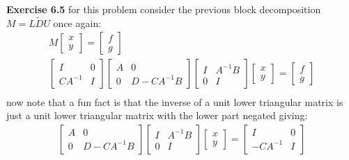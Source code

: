 \documentclass[12pt]{article}
\newenvironment{exercise}[1]{\vspace{.1in}\noindent\textbf{Exercise #1 \hspace{.05em}}}{}
\theoremstyle{definition}
\theoremstyle{remark}
\begin{document}
\begin{exercise}{6.5}
	for this problem consider the previous block decomposition $M=L \tilde{D}U$ once again:
	\begin{align}
		M %
		\begin{bmatrix}
			x \\
			y
		\end{bmatrix}=%
		\begin{bmatrix}
			f \\
			g
		\end{bmatrix} \\
		\begin{bmatrix}
			I       & 0 \\
			CA^{-1} & I
		\end{bmatrix}%
		\begin{bmatrix}
			A & 0          \\
			0 & D-CA^{-1}B
		\end{bmatrix}%
		\begin{bmatrix}
			I & A^{-1}B \\
			0 & I
		\end{bmatrix}
		\begin{bmatrix}
			x \\
			y
		\end{bmatrix}=%
		\begin{bmatrix}
			f \\
			g
		\end{bmatrix} \\
	\end{align}
	now note that a fun fact is that the inverse of a unit lower triangular matrix is just a unit lower triangular matrix with the lower part negated giving:
	\begin{align}
		\begin{bmatrix}
			A & 0          \\
			0 & D-CA^{-1}B
		\end{bmatrix}%
		\begin{bmatrix}
			I & A^{-1}B \\
			0 & I
		\end{bmatrix}
		\begin{bmatrix}
			x \\
			y
		\end{bmatrix}=%
		\begin{bmatrix}
			I        & 0 \\
			-CA^{-1} & I
		\end{bmatrix}%

\end{align}
\end{exercise}
\end{document}
